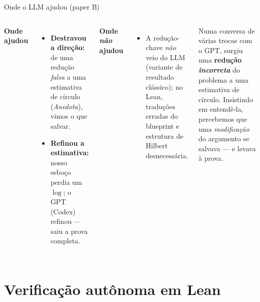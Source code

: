 \documentclass[10pt,aspectratio=169]{beamer}
\newcommand{\hl}[1]{{\color{accent}\textbf{#1}}}
\newcommand{\hlo}[1]{{\color{accent3}\textbf{#1}}}
\begin{document}
\begin{frame}{Onde o LLM ajudou (paper B)}
  \begin{columns}[T,onlytextwidth]
    \textbf{\color{accent}Onde ajudou}
    \begin{itemize}\small
      \setlength{\itemsep}{0.3em}
      \item \hl{Destravou a direção:} de uma redução \emph{falsa} a
            uma estimativa de círculo (\emph{Anedota}), vimos o que
            salvar.
      \item \hl{Refinou a estimativa:} nosso esboço perdia um
            $\log$; o GPT (Codex) refinou --- saiu a prova completa.
    \end{itemize}
    \vspace{0.35em}
    \pause
    \textbf{\color{accentred}Onde \emph{não} ajudou}
    \begin{itemize}\small
      \item A redução-chave \emph{não} veio do LLM (variante de
            resultado clássico); no Lean, traduções erradas do
            blueprint e estrutura de Hilbert desnecessária.
    \end{itemize}

    \pause
    \begin{tcolorbox}[colback=bgpanel,colframe=accent2,arc=2pt,boxrule=0.5pt,
                       left=8pt,right=8pt,top=6pt,bottom=6pt,
                       title={\sffamily\bfseries\small Anedota --- a redução falsa que funcionou},
                       coltitle=bgdark,fonttitle=\small]
      \small\color{fgmain}
      Numa conversa de várias trocas com o GPT, surgiu uma
      \hlo{redução \emph{incorreta}} do problema a uma estimativa de
      círculo. Insistindo em entendê-la, percebemos que uma
      \emph{modificação} do argumento se salvava --- e levava à prova.
    \end{tcolorbox}
  \end{columns}
\end{frame}

\section{Verificação autônoma em Lean}
\end{document}
